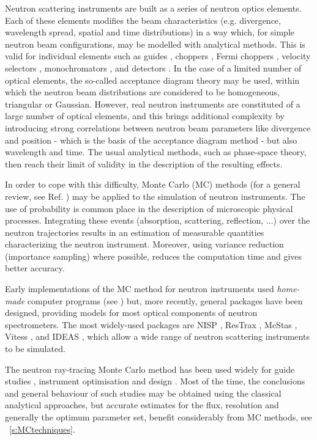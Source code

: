 Neutron scattering instruments are built as a series of neutron optics elements. Each of these elements modifies the beam characteristics (e.g. divergence, wavelength spread, spatial and time distributions) in a way which, for simple neutron beam configurations, may be modelled with analytical methods. This is valid for individual elements such as guides \cite{Leibnitz63,Mildner90}, choppers \cite{Lowde60,Copley03}, Fermi choppers \cite{Fermi47,Peters05}, velocity selectors \cite{Clark66}, monochromators \cite{Freund83,Sears97,Shirane02,Alianelli04}, and detectors \cite{Radeka74,Charpak89,Manzin04}. In the case of a limited number of optical elements, the so-called acceptance diagram theory \cite{Mildner90,Copley93,Cussen03} may be used, within which the neutron beam distributions are considered to be homogeneous, triangular or Gaussian.
However, real neutron instruments are constituted of a large number of optical elements, and this brings additional complexity by introducing strong correlations between neutron beam parameters like divergence and position - which is the basis of the acceptance diagram method - but also wavelength and time. The usual analytical methods, such as phase-space theory, then reach their limit of validity in the description of the resulting effects.

In order to cope with this difficulty, Monte Carlo (MC) methods (for a general review, see Ref. \cite{James80}) may be applied to the simulation of neutron instruments.
The use of probability is common place in the description of microscopic physical processes. Integrating these events (absorption, scattering, reflection, ...) over the neutron trajectories
results in an estimation of measurable quantities characterizing the neutron instrument. Moreover, using variance reduction (importance sampling)
where possible, reduces the computation time and gives better accuracy.

Early implementations of the MC method for neutron instruments used \emph{home-made} computer programs  (see \cite{Copley86,Mildner77}) but, more recently, general packages have been designed, providing models for most optical components of neutron spectrometers.
The most widely-used packages are NISP \cite{NISP}, ResTrax \cite{Restrax}, McStas \cite{nn_10_20,mcstas_webpage}, Vitess \cite{Vitess}, and IDEAS \cite{IDEAS}, which allow a wide range of neutron scattering instruments to be simulated.

The neutron ray-tracing Monte Carlo method has been used widely for
guide studies \cite{Copley93,Farhi02,Schanzer04}, instrument
optimisation and design \cite{Zsigmond04,Lieutenant05}. Most of the
time, the conclusions and general behaviour of such studies may be
obtained using the classical analytical approaches, but accurate
estimates for the flux, resolution and generally the optimum parameter
set, benefit considerably from MC methods, see ~\ref{s:MCtechniques}.


